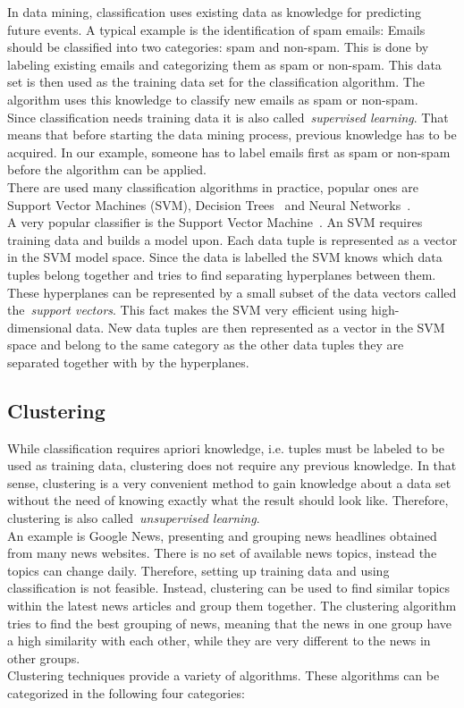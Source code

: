 In data mining, classification uses existing data as knowledge for predicting future events. A typical example is the identification of spam emails: Emails should be classified into two categories: spam and non-spam. This is done by labeling existing emails and categorizing them as spam or non-spam. This data set is then used as the training data set for the classification algorithm. The algorithm uses this knowledge to classify new emails as spam or non-spam.
\\
Since classification needs training data it is also called~\emph{supervised learning}. That means that before starting the data mining process, previous knowledge has to be acquired. In our example, someone has to label emails first as spam or non-spam before the algorithm can be applied. 
\\
There are used many classification algorithms in practice, popular ones are Support Vector Machines (SVM), Decision Trees~\parencite{descisiontree} and Neural Networks~\parencite{neuralnetwork}.
\\
A very popular classifier is the Support Vector Machine~\parencite{svm}. An SVM requires training data and builds a model upon. Each data tuple is represented as a vector in the SVM model space. Since the data is labelled the SVM knows which data tuples belong together and tries to find separating hyperplanes between them. These hyperplanes can be represented by a small subset of the data vectors called the~\emph{support vectors}. This fact makes the SVM very efficient using high-dimensional data. New data tuples are then represented as a vector in the SVM space and belong to the same category as the other data tuples they are separated together with by the hyperplanes.

\subsection{Clustering}

While classification requires apriori knowledge, i.e. tuples must be labeled to be used as training data, clustering does not require any previous knowledge. In that sense, clustering is a very convenient method to gain knowledge about a data set without the need of knowing exactly what the result should look like. Therefore, clustering is also called~\emph{unsupervised learning}.
\\
An example is Google News, presenting and grouping news headlines obtained from many news websites. There is no set of available news topics, instead the topics can change daily. Therefore, setting up training data and using classification is not feasible. Instead, clustering can be used to find similar topics within the latest news articles and group them together. The clustering algorithm tries to find the best grouping of news, meaning that the news in one group have a high similarity with each other, while they are very different to the news in other groups. 
\\
Clustering techniques provide a variety of algorithms. These algorithms can be categorized in the following four categories:

